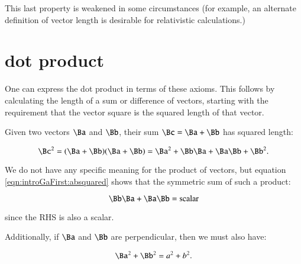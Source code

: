 This last property is weakened in some circumstances (for example, 
an alternate definition of vector length is desirable for relativistic calculations.)

%
%
%

\section{dot product }

One can express the dot product in terms of these axioms.  This follows by calculating the 
length of a sum or difference of vectors, starting with the requirement that the vector square is the squared length of that vector.

Given two vectors $\Ba$ and $\Bb$, their sum
$\Bc = \Ba + \Bb$ has squared length:

\begin{equation}\label{eqn:introGaFirst:absquared}
\Bc^2 = (\Ba + \Bb)(\Ba + \Bb) = \Ba^2 + \Bb\Ba + \Ba\Bb + \Bb^2.
\end{equation}

We do not have any specific meaning for the product of vectors, but equation \ref{eqn:introGaFirst:absquared}
shows that the symmetric sum of such a product:

\begin{equation}
\Bb\Ba + \Ba\Bb = \text{scalar}
\end{equation}

since the RHS is also a scalar.

Additionally, if $\Ba$ and $\Bb$ are perpendicular, then we must also have:

\[
\Ba^2 + \Bb^2 = a^2 + b^2.
\]

